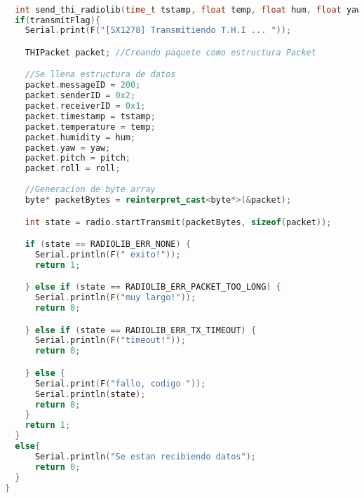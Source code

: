 \begin{lstlisting}[language=C++, caption=Tarea de envío de datos de variables ambientales e inclinación desde sensor inteligente]

  int send_thi_radiolib(time_t tstamp, float temp, float hum, float yaw, float pitch, float roll){
  if(transmitFlag){
    Serial.print(F("[SX1278] Transmitiendo T.H.I ... "));

    THIPacket packet; //Creando paquete como estructura Packet

    //Se llena estructura de datos
    packet.messageID = 200;
    packet.senderID = 0x2;
    packet.receiverID = 0x1; 
    packet.timestamp = tstamp;
    packet.temperature = temp;
    packet.humidity = hum;
    packet.yaw = yaw;
    packet.pitch = pitch;
    packet.roll = roll;
    
    //Generacion de byte array
    byte* packetBytes = reinterpret_cast<byte*>(&packet);

    int state = radio.startTransmit(packetBytes, sizeof(packet));

    if (state == RADIOLIB_ERR_NONE) {
      Serial.println(F(" exito!"));
      return 1;

    } else if (state == RADIOLIB_ERR_PACKET_TOO_LONG) {
      Serial.println(F("muy largo!"));
      return 0;

    } else if (state == RADIOLIB_ERR_TX_TIMEOUT) {
      Serial.println(F("timeout!"));
      return 0;

    } else {
      Serial.print(F("fallo, codigo "));
      Serial.println(state);
      return 0;
    }
    return 1;
  }
  else{
      Serial.println("Se estan recibiendo datos");
      return 0;
  }  
}

\end{lstlisting}